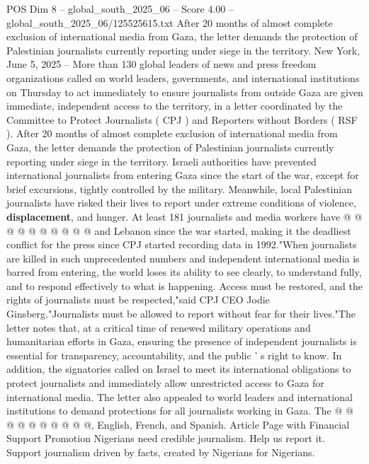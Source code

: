 \begin{textsample}{POS Dim 8 – global\_south\_2025\_06 – Score 4.00 – global\_south\_2025\_06/125525615.txt}  \label{ex:f8_pos_193}
After 20 months of almost complete exclusion of international media from Gaza, the letter demands the protection of Palestinian journalists currently reporting under siege in the territory.
New York, June 5, 2025 -- More than 130 global leaders of news and press freedom organizations called on world leaders, governments, and international institutions on Thursday to act immediately to ensure journalists from outside Gaza are given immediate, independent access to the territory, in a letter coordinated by the Committee to Protect Journalists ( CPJ ) and Reporters without Borders ( RSF ).
After 20 months of almost complete exclusion of international media from Gaza, the letter demands the protection of Palestinian journalists currently reporting under siege in the territory.
Israeli authorities have prevented international journalists from entering Gaza since the start of the war, except for brief excursions, tightly controlled by the military.
Meanwhile, local Palestinian journalists have risked their lives to report under extreme conditions of violence, \textbf{displacement}, and hunger.
At least 181 journalists and media workers have @ @ @ @ @ @ @ @ @ @ and Lebanon since the war started, making it the deadliest conflict for the press since CPJ started recording data in 1992."When journalists are killed in such unprecedented numbers and independent international media is barred from entering, the world loses its ability to see clearly, to understand fully, and to respond effectively to what is happening.
Access must be restored, and the rights of journalists must be respected,"said CPJ CEO Jodie Ginsberg."Journalists must be allowed to report without fear for their lives."The letter notes that, at a critical time of renewed military operations and humanitarian efforts in Gaza, ensuring the presence of independent journalists is essential for transparency, accountability, and the public ' s right to know.
In addition, the signatories called on Israel to meet its international obligations to protect journalists and immediately allow unrestricted access to Gaza for international media.
The letter also appealed to world leaders and international institutions to demand protections for all journalists working in Gaza.
The @ @ @ @ @ @ @ @ @ @, English, French, and Spanish.
Article Page with Financial Support Promotion Nigerians need credible journalism.
Help us report it.
Support journalism driven by facts, created by Nigerians for Nigerians.

\end{textsample}
